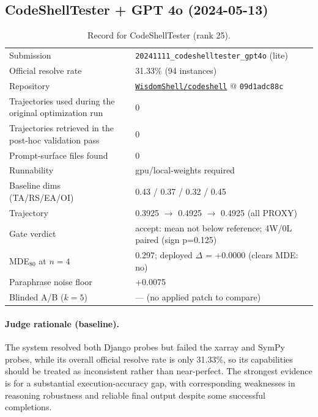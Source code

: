 \subsection{CodeShellTester + GPT 4o (2024-05-13)}
\label{app:agent25}
\begin{table}[h]\centering\scriptsize
\caption{Record for CodeShellTester (rank 25).}
\begin{tabular}{lp{8.2cm}}\toprule
Submission & \texttt{20241111\_\allowbreak{}codeshelltester\_\allowbreak{}gpt4o} (lite) \\
Official resolve rate & 31.33\% (94 instances) \\
Repository & \href{https://github.com/WisdomShell/codeshell}{\texttt{WisdomShell/codeshell}} @ \texttt{09d1adc88c} \\
Trajectories used during the original optimization run & 0 \\
Trajectories retrieved in the post-hoc validation pass & 0 \\
Prompt-surface files found & 0 \\
Runnability & gpu/local-weights required \\
Baseline dims (TA/RS/EA/OI) & 0.43 / 0.37 / 0.32 / 0.45 \\
Trajectory & 0.3925 $\to$ 0.4925 $\to$ 0.4925 (all PROXY) \\
Gate verdict & accept: mean not below reference; 4W/0L paired (sign p=0.125) \\
MDE$_{80}$ at $n{=}4$ & 0.297; deployed $\Delta$ = +0.0000 (clears MDE: no) \\
Paraphrase noise floor & +0.0075 \\
Blinded A/B ($k{=}5$) & --- (no applied patch to compare) \\
\bottomrule\end{tabular}\end{table}
\paragraph{Judge rationale (baseline).}
The system resolved both Django probes but failed the xarray and SymPy probes, while its overall official resolve rate is only 31.33\%, so its capabilities should be treated as inconsistent rather than near-perfect. The strongest evidence is for a substantial execution-accuracy gap, with corresponding weaknesses in reasoning robustness and reliable final output despite some successful completions.
